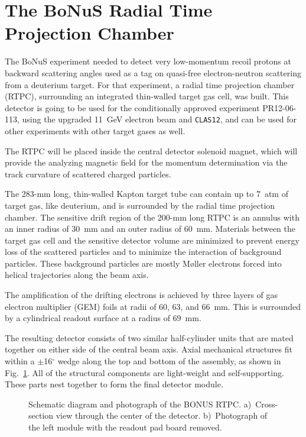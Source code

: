 \section{The BoNuS Radial Time Projection Chamber}

The BoNuS experiment needed to detect very low-momentum recoil protons at
backward scattering angles used as a tag on quasi-free electron-neutron 
scattering from a deuterium target.  For that experiment, a radial time 
projection chamber (RTPC), surrounding an integrated thin-walled target gas 
cell, was built. This detector is going to be used for the conditionally 
approved experiment PR12-06-113, using the upgraded 11~GeV electron beam and 
{\tt CLAS12}, and can be used for other experiments with other target gases 
as well.

The RTPC will be placed inside the central detector solenoid magnet,
which will provide the analyzing magnetic field for the momentum 
determination via the track curvature of scattered charged particles.

The 283-mm long, thin-walled Kapton target tube can contain up to 7~atm of 
target gas, like deuterium, and is surrounded by the radial time projection 
chamber.  The sensitive drift region of the 200-mm long RTPC is an annulus 
with an inner radius of 30~mm and an outer radius of 60~mm.  Materials 
between the target gas cell and the sensitive detector volume are minimized 
to prevent energy loss of the scattered particles and to minimize the 
interaction of background particles.  These background particles are mostly 
M{\o}ller electrons forced into helical trajectories along the beam axis.

The amplification of the drifting electrons is achieved by three layers of 
gas electron multiplier (GEM) foils at radii of 60, 63, and 66~mm.  This is 
surrounded by a cylindrical readout surface at a radius of 69~mm. 

The resulting detector consists of two similar half-cylinder units that
are mated together on either side of the central beam axis.  Axial
mechanical structures fit within a $\pm$16$^\circ$ wedge along the top
and bottom of the assembly, as shown in Fig.~\ref{fig:prod_schem_expl}.
All of the structural components are light-weight and self-supporting.
These parts nest together to form the final detector module. 

\begin{figure}[htbp]
\caption{\small{Schematic diagram and photograph of the BONUS RTPC. 
a)~Cross-section view through the center of the detector.  b)~Photograph of 
the left module with the readout pad board removed.}}
\label{fig:prod_schem_expl}
\end{figure}

